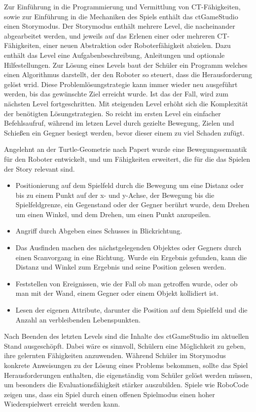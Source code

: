 Zur Einführung in die Programmierung und Vermittlung von CT-Fähigkeiten, sowie zur Einführung in die
Mechaniken des Spiels enthält das ctGameStudio einen Storymodus. Der Storymodus enthält mehrere
Level, die nacheinander abgearbeitet werden, und jeweils auf das Erlenen einer oder mehreren
CT-Fähigkeiten, einer neuen Abstraktion oder Roboterfähigkeit abzielen. Dazu enthält das Level eine
Aufgabenbeschreibung, Anleitungen und optionale Hilfestellungen. Zur Lösung eines Levels baut der Schüler ein
Programm welches einen Algorithmus darstellt, der den Roboter so steuert, dass die Herausforderung
gelöst wrid. Diese Problemlösungstrategie kann immer wieder neu ausgeführt werden, bis das
gewünschte Ziel erreicht wurde. Ist das der Fall, wird zum nächsten Level fortgeschritten. Mit
steigenden Level erhöht sich die Komplexität der benötigten Lösungstrategien. So reicht im ersten
Level ein einfacher Befehlsaufruf, während im letzen Level durch gezielte Bewegung, Zielen und
Schießen ein Gegner besiegt werden, bevor dieser einem zu viel Schaden zufügt.

Angelehnt an der Turtle-Geometrie nach Papert wurde eine Bewegungssemantik für den Roboter
entwickelt, und um Fähigkeiten erweitert, die für die das Spielen der Story relevant sind.

\begin{itemize}
\item Positionierung auf dem Spielfeld durch die Bewegung um eine Distanz oder bis zu einem Punkt
auf der x- und y-Achse, der Bewegung bis die Spielfeldgrenze, ein Gegenstand oder der Gegner berührt wurde, dem Drehen um einen
Winkel, und dem Drehen, um einen Punkt anzupeilen.
\item Angriff durch Abgeben eines Schusses in Blickrichtung.
\item Das Ausfinden machen des nächstgelegenden Objektes oder Gegners durch einen Scanvorgang in eine Richtung. Wurde
  ein Ergebnis gefunden, kann die Distanz und Winkel zum Ergebnis und seine Position gelesen werden.
\item Feststellen von Ereignissen, wie der Fall ob man getroffen wurde, oder ob man mit der Wand,
  einem Gegner oder einem Objekt kollidiert ist.
\item Lesen der eigenen Attribute, darunter die Position auf dem Spielfeld und die Anzahl an
verbleibenden Lebenspunkten.
\end{itemize}

Nach Beenden des letzten Levels sind die Inhalte des ctGameStudio im aktuellen Stand ausgeschöpft.
Dabei wäre es sinnvoll, Schülern eine Möglichkeit zu geben, ihre gelernten Fähigkeiten anzuwenden.
Während Schüler im Storymodus konkrete Anweisungen zu der Lösung eines Problems bekommen, sollte das
Spiel Herausforderungen enthalten, die eigenständig vom Schüler gelöst werden müssen, um besonders
die Evaluationsfähigkeit stärker auszubilden. Spiele wie RoboCode zeigen uns, dass ein Spiel durch
einen offenen Spielmodus einen hoher Wiederspielwert erreicht werden kann.
